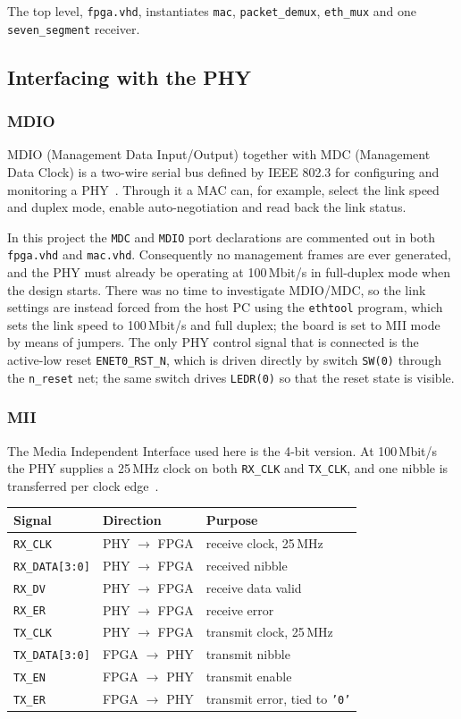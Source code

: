 \documentclass[11pt,a4paper]{article}
\begin{document}
The top level, \texttt{fpga.vhd}, instantiates \texttt{mac}, \texttt{packet\_demux}, \texttt{eth\_mux} and one \texttt{seven\_segment} receiver.

\subsection{Interfacing with the PHY}

\subsubsection{MDIO}
MDIO (Management Data Input/Output) together with MDC (Management Data Clock) is a two-wire serial bus defined by IEEE 802.3 for configuring and monitoring a PHY~\cite{ieee8023}. Through it a MAC can, for example, select the link speed and duplex mode, enable auto-negotiation and read back the link status.

In this project the \texttt{MDC} and \texttt{MDIO} port declarations are commented out in both \texttt{fpga.vhd} and \texttt{mac.vhd}. Consequently no management frames are ever generated, and the PHY must already be operating at 100\,Mbit/s in full-duplex mode when the design starts. There was no time to investigate MDIO/MDC, so the link settings are instead forced from the host PC using the \texttt{ethtool} program, which sets the link speed to 100\,Mbit/s and full duplex; the board is set to MII mode by means of jumpers. The only PHY control signal that is connected is the active-low reset \texttt{ENET0\_RST\_N}, which is driven directly by switch \texttt{SW(0)} through the \texttt{n\_reset} net; the same switch drives \texttt{LEDR(0)} so that the reset state is visible.

\subsubsection{MII}
The Media Independent Interface used here is the 4-bit version. At 100\,Mbit/s the PHY supplies a 25\,MHz clock on both \texttt{RX\_CLK} and \texttt{TX\_CLK}, and one nibble is transferred per clock edge~\cite{ieee8023}.

\begin{center}
\begin{tabular}{lll}
\hline
Signal & Direction & Purpose \\
\hline
\texttt{RX\_CLK} & PHY $\to$ FPGA & receive clock, 25\,MHz \\
\texttt{RX\_DATA[3:0]} & PHY $\to$ FPGA & received nibble \\
\texttt{RX\_DV} & PHY $\to$ FPGA & receive data valid \\
\texttt{RX\_ER} & PHY $\to$ FPGA & receive error \\
\texttt{TX\_CLK} & PHY $\to$ FPGA & transmit clock, 25\,MHz \\
\texttt{TX\_DATA[3:0]} & FPGA $\to$ PHY & transmit nibble \\
\texttt{TX\_EN} & FPGA $\to$ PHY & transmit enable \\
\texttt{TX\_ER} & FPGA $\to$ PHY & transmit error, tied to \texttt{'0'} \\
\hline
\end{tabular}
\end{center}
\end{document}
